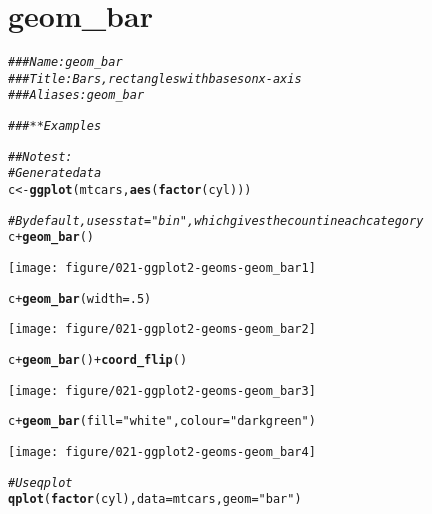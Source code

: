 \documentclass[a4paper,titlepage]{tufte-handout}\usepackage[]{graphicx}\usepackage[]{color}
\makeatletter
\def\maxwidth{ %
  \ifdim\Gin@nat@width>\linewidth
    \linewidth
  \else
    \Gin@nat@width
  \fi
}
\newcommand{\hlnum}[1]{\textcolor[rgb]{0.686,0.059,0.569}{#1}}%
\newcommand{\hlstr}[1]{\textcolor[rgb]{0.192,0.494,0.8}{#1}}%
\newcommand{\hlcom}[1]{\textcolor[rgb]{0.678,0.584,0.686}{\textit{#1}}}%
\newcommand{\hlopt}[1]{\textcolor[rgb]{0,0,0}{#1}}%
\newcommand{\hlstd}[1]{\textcolor[rgb]{0.345,0.345,0.345}{#1}}%
\newcommand{\hlkwb}[1]{\textcolor[rgb]{0.69,0.353,0.396}{#1}}%
\newcommand{\hlkwc}[1]{\textcolor[rgb]{0.333,0.667,0.333}{#1}}%
\newcommand{\hlkwd}[1]{\textcolor[rgb]{0.737,0.353,0.396}{\textbf{#1}}}%
\newenvironment{kframe}{%
 \def\at@end@of@kframe{}%
 \ifinner\ifhmode%
  \def\at@end@of@kframe{\end{minipage}}%
  \begin{minipage}{\columnwidth}%
 \fi\fi%
 \def\FrameCommand##1{\hskip\@totalleftmargin \hskip-\fboxsep
 \colorbox{shadecolor}{##1}\hskip-\fboxsep
     \hskip-\linewidth \hskip-\@totalleftmargin \hskip\columnwidth}%
 \MakeFramed {\advance\hsize-\width
   \@totalleftmargin\z@ \linewidth\hsize
   \@setminipage}}%
 {\par\unskip\endMakeFramed%
 \at@end@of@kframe}
\newenvironment{knitrout}{}{} %
\makeatother
\begin{document}
\section{geom\_bar}

\begin{knitrout}
\color{fgcolor}\begin{kframe}
\begin{alltt}
\hlcom{### Name: geom_bar}
\hlcom{### Title: Bars, rectangles with bases on x-axis}
\hlcom{### Aliases: geom_bar}

\hlcom{### ** Examples}

\hlcom{## No test: }
\hlcom{# Generate data}
\hlstd{c} \hlkwb{<-} \hlkwd{ggplot}\hlstd{(mtcars,} \hlkwd{aes}\hlstd{(}\hlkwd{factor}\hlstd{(cyl)))}

\hlcom{# By default, uses stat="bin", which gives the count in each category}
\hlstd{c} \hlopt{+} \hlkwd{geom_bar}\hlstd{()}
\end{alltt}
\end{kframe}
\texttt{[image: figure/021-ggplot2-geoms-geom\_bar1]} 
\begin{kframe}\begin{alltt}
\hlstd{c} \hlopt{+} \hlkwd{geom_bar}\hlstd{(}\hlkwc{width}\hlstd{=}\hlnum{.5}\hlstd{)}
\end{alltt}
\end{kframe}
\texttt{[image: figure/021-ggplot2-geoms-geom\_bar2]} 
\begin{kframe}\begin{alltt}
\hlstd{c} \hlopt{+} \hlkwd{geom_bar}\hlstd{()} \hlopt{+} \hlkwd{coord_flip}\hlstd{()}
\end{alltt}
\end{kframe}
\texttt{[image: figure/021-ggplot2-geoms-geom\_bar3]} 
\begin{kframe}\begin{alltt}
\hlstd{c} \hlopt{+} \hlkwd{geom_bar}\hlstd{(}\hlkwc{fill}\hlstd{=}\hlstr{"white"}\hlstd{,} \hlkwc{colour}\hlstd{=}\hlstr{"darkgreen"}\hlstd{)}
\end{alltt}
\end{kframe}
\texttt{[image: figure/021-ggplot2-geoms-geom\_bar4]} 
\begin{kframe}\begin{alltt}
\hlcom{# Use qplot}
\hlkwd{qplot}\hlstd{(}\hlkwd{factor}\hlstd{(cyl),} \hlkwc{data}\hlstd{=mtcars,} \hlkwc{geom}\hlstd{=}\hlstr{"bar"}\hlstd{)}
\end{alltt}

\end{kframe}
\end{knitrout}
\end{document}
